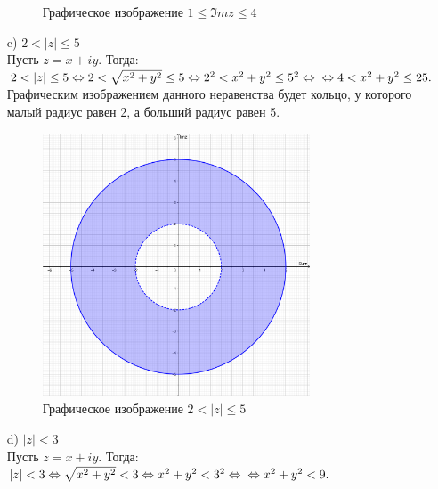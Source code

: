\documentclass[12pt, a4paper]{article}
\begin{document}
\begin{enumerate}
\begin{figure}[h]
            \caption{Графическое изображение $1 \leq \Im mz \leq 4$}
        \end{figure}\newpage
        \item [c)] $2 < |z| \leq 5$\\
        Пусть $z = x + iy$. Тогда:\\
        \begin{math}
            2 < |z| \leq 5 \Leftrightarrow
            2 < \sqrt{x^2 + y^2} \leq 5\Leftrightarrow
            2^2 < x^2 + y^2 \leq 5^2 \Leftrightarrow\\\Leftrightarrow
            4 < x^2 + y^2 \leq 25.
        \end{math}\\
        Графическим изображением данного неравенства будет кольцо,
        у которого малый радиус равен 2, а больший радиус равен 5.\\
        \begin{figure}[h]
            \centering
            \includegraphics[width=0.75\textwidth]{task4-c.png}
            \caption{Графическое изображение $2 < |z| \leq 5$}
        \end{figure}\newpage
        \item [d)] $|z| < 3$\\
        Пусть $z = x + iy$. Тогда:\\
        \begin{math}
            |z| < 3 \Leftrightarrow
            \sqrt{x^2 + y^2} < 3 \Leftrightarrow
            x^2 + y^2 < 3^2 \Leftrightarrow\\\Leftrightarrow
            x^2 + y^2 < 9.
        \end{math}\\

\end{enumerate}
\end{document}
